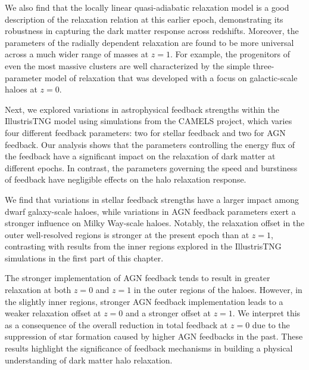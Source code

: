 We also find that the locally linear quasi-adiabatic relaxation model is a good description of the relaxation relation at this earlier epoch, demonstrating its robustness in capturing the dark matter response across redshifts. Moreover, the parameters of the radially dependent relaxation are found to be more universal across a much wider range of masses at \( z=1 \). For example, the progenitors of even the most massive clusters are well characterized by the simple three-parameter model of relaxation that was developed with a focus on galactic-scale haloes at \( z=0 \). 

Next, we explored variations in astrophysical feedback strengths within the IllustrisTNG model using simulations from the CAMELS project, which varies four different feedback parameters: two for stellar feedback and two for AGN feedback. Our analysis shows that the parameters controlling the energy flux of the feedback have a significant impact on the relaxation of dark matter at different epochs. In contrast, the parameters governing the speed and burstiness of feedback have negligible effects on the halo relaxation response. 

We find that variations in stellar feedback strengths have a larger impact among dwarf galaxy-scale haloes, while variations in AGN feedback parameters exert a stronger influence on Milky Way-scale haloes. Notably, the relaxation offset in the outer well-resolved regions is stronger at the present epoch than at \( z=1 \), contrasting with results from the inner regions explored in the IllustrisTNG simulations in the first part of this chapter.

The stronger implementation of AGN feedback tends to result in greater relaxation at both \( z=0 \) and \( z=1 \) in the outer regions of the haloes. However, in the slightly inner regions, stronger AGN feedback implementation leads to a weaker relaxation offset at \( z=0 \) and a stronger offset at \( z=1 \). We interpret this as a consequence of the overall reduction in total feedback at \( z=0 \) due to the suppression of star formation caused by higher AGN feedbacks in the past. These results highlight the significance of feedback mechanisms in building a physical understanding of dark matter halo relaxation.

